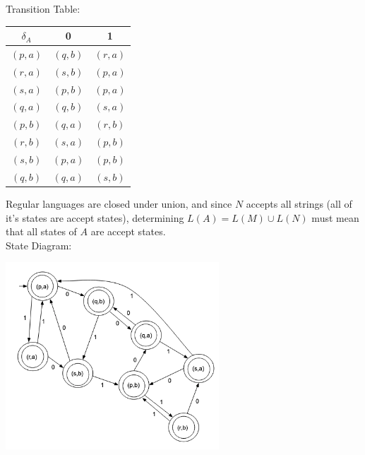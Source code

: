 \documentclass{article}
\begin{document}
Transition Table:
\begin{center}
\begin{tabular}{||c c c||} 
 \hline
 $\delta_{A}$ & 0 & 1\\ [0.5ex] 
 \hline\hline
 $(p,a)$ & $(q,b)$ & $(r,a)$\\
 \hline
 $(r,a)$ & $(s,b)$ & $(p,a)$\\
 \hline
 $(s,a)$ & $(p,b)$ & $(p,a)$\\
 \hline
 $(q,a)$ & $(q,b)$ & $(s,a)$\\
 \hline
 $(p,b)$ & $(q,a)$ & $(r,b)$\\
 \hline
 $(r,b)$ & $(s,a)$ & $(p,b)$\\
 \hline
 $(s,b)$ & $(p,a)$ & $(p,b)$\\
 \hline
 $(q,b)$ & $(q,a)$ & $(s,b)$\\
 \hline
\end{tabular}
\end{center}

Regular languages are closed under union, and since $N$ accepts all strings (all of it's states are accept states), determining $L(A) = L(M) \cup L(N)$ must mean that all states of $A$ are accept states.\\

\break
State Diagram:
\begin{center}
    \includegraphics[width=0.6\textwidth]{5-3.png}
\end{center}
\end{document}

